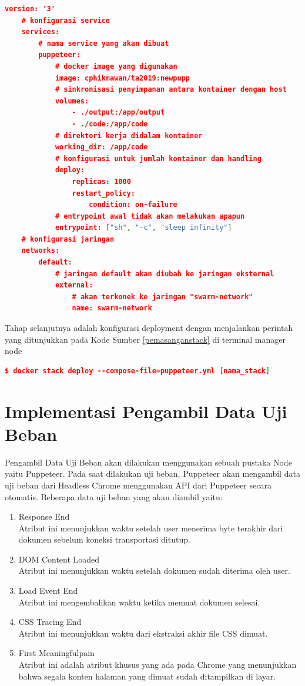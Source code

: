			\begin{lstlisting}[frame=single,tabsize=2,breaklines,caption={Konfigurasi puppeteer.yml},label=puppyaml, captionpos=b, language=json]
	version: '3'
	# konfigurasi service
	services:
		# nama service yang akan dibuat
		puppeteer:
			# docker image yang digunakan
			image: cphikmawan/ta2019:newpupp
			# sinkronisasi penyimpanan antara kontainer dengan host
			volumes:
				- ./output:/app/output
				- ./code:/app/code
			# direktori kerja didalam kontainer
			working_dir: /app/code
			# konfigurasi untuk jumlah kontainer dan handling
			deploy:
				replicas: 1000
				restart_policy:
					condition: on-failure
			# entrypoint awal tidak akan melakukan apapun
			entrypoint: ["sh", "-c", "sleep infinity"]
	# konfigurasi jaringan
	networks:
		default:
			# jaringan default akan diubah ke jaringan eksternal
			external:
				# akan terkonek ke jaringan "swarm-network"
				name: swarm-network
			\end{lstlisting}
			
			\indent Tahap selanjutnya adalah konfigurasi deployment dengan menjalankan perintah yang ditunjukkan pada Kode Sumber \ref{pemasanganstack} di terminal manager node
			\begin{lstlisting}[frame=single,tabsize=2,breaklines,caption={Perintah untuk pemasangan kontainer },label=pemasanganstack, captionpos=b, language=json,numbers=none]
	$ docker stack deploy --compose-file=puppeteer.yml [nama_stack]
			\end{lstlisting}
	
	\section{Implementasi Pengambil Data Uji Beban}
		Pengambil Data Uji Beban akan dilakukan menggunakan sebuah pustaka Node yaitu Puppeteer. Pada saat dilakukan uji beban, Puppeteer akan mengambil data uji beban dari Headless Chrome menggunakan API dari Puppeteer secara otomatis. Beberapa data uji beban yang akan diambil yaitu:
		\begin{enumerate}
			\item Response End \\
				Atribut ini menunjukkan waktu setelah user menerima byte terakhir dari dokumen sebelum koneksi transportasi ditutup.
			\item DOM Content Loaded \\
				Atribut ini menunjukkan waktu setelah dokumen sudah diterima oleh user.
			\item Load Event End \\
				Atribut ini mengembalikan waktu ketika memuat dokumen selesai.
			\item CSS Tracing End \\
				Atribut ini menunjukkan waktu dari ekstraksi akhir file CSS dimuat.
			\item First Meaningfulpain \\
				Atribut ini adalah atribut khusus yang ada pada Chrome yang menunjukkan bahwa segala konten halaman yang dimuat sudah ditampilkan di layar. \\
		\end{enumerate}
	 
